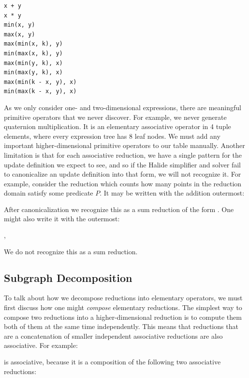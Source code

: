 \begin{lstlisting}[caption={The first 10 elementary associative operators for 32-bit signed integers}, label={lst:top10}]
x + y
x * y
min(x, y)
max(x, y)
max(min(x, k), y)
min(max(x, k), y)
max(min(y, k), x)
min(max(y, k), x)
max(min(k - x, y), x)
min(max(k - x, y), x)
\end{lstlisting}

As we only consider one- and two-dimensional expressions, there are meaningful primitive operators that we never discover. For example, we never generate quaternion multiplication. It is an elementary associative operator in 4 tuple elements, where every expression tree has 8 leaf nodes. We must add any important higher-dimensional primitive operators to our table manually. Another limitation is that for each associative reduction, we have a single pattern for the update definition we expect to see, and so if the Halide simplifier and solver fail to canonicalize an update definition into that form, we will not recognize it. For example, consider the reduction which counts how many points in the reduction domain satisfy some predicate $P$. It may be written with the addition outermost:


After canonicalization we recognize this as a sum reduction of the form . One might also write it with the  outermost:

,

We do not recognize this as a sum reduction.

\subsection{Subgraph Decomposition}
\label{subsec:decomposition}

To talk about how we decompose reductions into elementary operators, we must first discuss how one might \emph{compose} elementary reductions. The simplest way to compose two reductions into a higher-dimensional reduction is to compute them both of them at the same time independently. This means that reductions that are a concatenation of smaller independent associative reductions are also associative. For example:


is associative, because it is a composition of the following two associative reductions:

